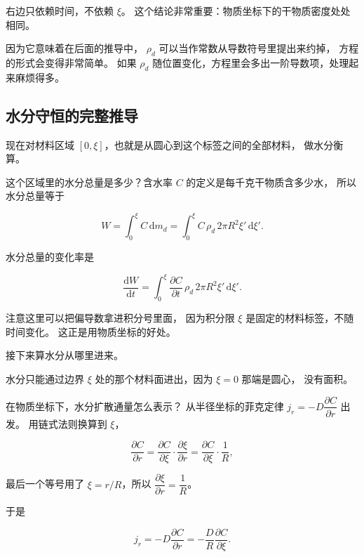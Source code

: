 右边只依赖时间，不依赖 $\xi$。
这个结论非常重要：物质坐标下的干物质密度处处相同。

因为它意味着在后面的推导中，
$\rho_d$ 可以当作常数从导数符号里提出来约掉，
方程的形式会变得非常简单。
如果 $\rho_d$ 随位置变化，方程里会多出一阶导数项，处理起来麻烦得多。

\subsection{水分守恒的完整推导}

现在对材料区域 $[0,\xi]$，也就是从圆心到这个标签之间的全部材料，
做水分衡算。

这个区域里的水分总量是多少？含水率 $C$ 的定义是每千克干物质含多少水，
所以水分总量等于

\begin{equation}
W = \int_0^\xi C\,\mathrm{d}m_d
= \int_0^\xi C\,\rho_d\,2\pi R^2\xi'\,\mathrm{d}\xi' .
\end{equation}

水分总量的变化率是

\begin{equation}
\frac{\mathrm{d}W}{\mathrm{d}t}
= \int_0^\xi \frac{\partial C}{\partial t}\,\rho_d\,2\pi R^2\xi'\,\mathrm{d}\xi' .
\label{eq:dWdt}
\end{equation}

注意这里可以把偏导数拿进积分号里面，
因为积分限 $\xi$ 是固定的材料标签，不随时间变化。
这正是用物质坐标的好处。

接下来算水分从哪里进来。

水分只能通过边界 $\xi$ 处的那个材料面进出，因为 $\xi=0$ 那端是圆心，
没有面积。

在物质坐标下，水分扩散通量怎么表示？
从半径坐标的菲克定律 $j_r = -D\dfrac{\partial C}{\partial r}$ 出发。
用链式法则换算到 $\xi$，

\begin{equation}
\frac{\partial C}{\partial r}
= \frac{\partial C}{\partial \xi}\cdot\frac{\partial \xi}{\partial r}
= \frac{\partial C}{\partial \xi}\cdot\frac{1}{R},
\end{equation}

最后一个等号用了 $\xi=r/R$，所以 $\dfrac{\partial\xi}{\partial r}=\dfrac{1}{R}$。

于是

\begin{equation}
j_r = -D\frac{\partial C}{\partial r} = -\frac{D}{R}\frac{\partial C}{\partial \xi}.
\end{equation}

